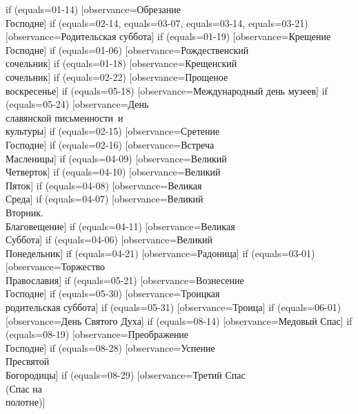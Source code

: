 {  if (equals=01-14) [observance=Обрезание\\ Господне]
  if (equals=02-14,
  	equals=03-07,
	equals=03-14,
	equals=03-21) [observance=Родительская суббота]
  if (equals=01-19) [observance=Крещение\\ Господне]
  if (equals=01-06) [observance=Рождественский\\ сочельник]
  if (equals=01-18) [observance=Крещенский\\ сочельник]
  if (equals=02-22) [observance=Прощеное\\ воскресенье]
  if (equals=05-18) [observance=Международный день музеев]
  if (equals=05-24) [observance=День\\ славянской письменности~и\\культуры]
  if (equals=02-15) [observance=Сретение\\ Господне]
  if (equals=02-16) [observance=Встреча\\ Масленицы]
  if (equals=04-09) [observance=Великий\\ Четверток]
  if (equals=04-10) [observance=Великий\\ Пяток]
  if (equals=04-08) [observance=Великая\\ Среда]
  if (equals=04-07) [observance=Великий\\ Вторник.\\ Благовещение]
  if (equals=04-11) [observance=Великая\\ Суббота]
  if (equals=04-06) [observance=Великий\\ Понедельник]
  if (equals=04-21) [observance=Радоница]
  if (equals=03-01) [observance=Торжество\\ Православия]
  if (equals=05-21) [observance=Вознесение\\ Господне]
  if (equals=05-30) [observance=Троицкая\\ родительская суббота]
  if (equals=05-31) [observance=Троица]
  if (equals=06-01) [observance=День Святого Духа]
  if (equals=08-14) [observance=Медовый Спас]
  if (equals=08-19) [observance=Преображение\\ Господне]
  if (equals=08-28) [observance=Успение\\ Пресвятой\\ Богородицы]
  if (equals=08-29) [observance=Третий Спас\\ (Спас на\\ полотне)]
}
